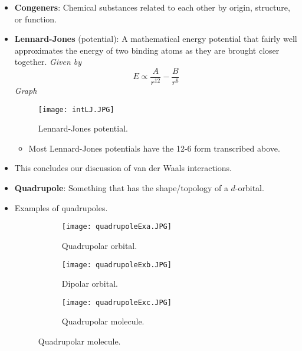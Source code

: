 \documentclass[../notes.tex]{subfiles}
\begin{document}
\begin{itemize}
\begin{itemize}
\begin{itemize}
\begin{itemize}
            \end{itemize}
        \end{itemize}
    \end{itemize}
    \item \textbf{Congeners}: Chemical substances related to each other by origin, structure, or function.
    \item \textbf{Lennard-Jones} (potential): A mathematical energy potential that fairly well approximates the energy of two binding atoms as they are brought closer together. \emph{Given by}
    \begin{equation*}
        E \propto \frac{A}{r^{12}}-\frac{B}{r^6}
    \end{equation*}
    \emph{Graph}
    \begin{figure}[h!]
        \centering
        \texttt{[image: intLJ.JPG]}
        \caption{Lennard-Jones potential.}
        \label{fig:intLJ}
    \end{figure}
    \begin{itemize}
        \item Most Lennard-Jones potentials have the 12-6 form transcribed above.
    \end{itemize}
    \item This concludes our discussion of van der Waals interactions.
    \pagebreak
    \item \textbf{Quadrupole}: Something that has the shape/topology of a $d$-orbital.
    \item Examples of quadrupoles.
    \begin{figure}[h!]
        \centering
        \begin{subfigure}[b]{0.25\linewidth}
            \centering
            \texttt{[image: quadrupoleExa.JPG]}
            \caption{Quadrupolar orbital.}
            \label{fig:quadrupoleExa}
        \end{subfigure}
        \begin{subfigure}[b]{0.25\linewidth}
            \centering
            \texttt{[image: quadrupoleExb.JPG]}
            \caption{Dipolar orbital.}
            \label{fig:quadrupoleExb}
        \end{subfigure}
        \begin{subfigure}[b]{0.4\linewidth}
            \centering
            \texttt{[image: quadrupoleExc.JPG]}
            \caption{Quadrupolar molecule.}
            \label{fig:quadrupoleExc}
        \end{subfigure}

\end{figure}
\end{itemize}
\end{document}
